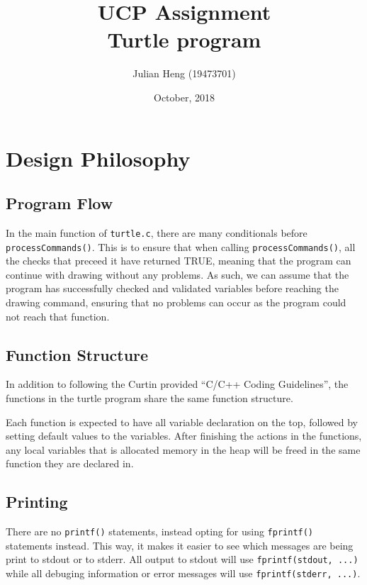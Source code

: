 \documentclass[a4paper, 12pt, titlepage]{article}
\title{\huge \textbf{UCP Assignment\\Turtle program}}
\author{Julian Heng (19473701)}
\date{October, 2018}
\newcommand{\code}[1]{\small\texttt{#1}\normalsize}
\begin{document}
\maketitle
\tableofcontents
\newpage

\pagestyle{fancy}

\fancyhf[FC]{\thepage}

\section{Design Philosophy}

\subsection{Program Flow}

In the main function of \code{turtle.c}, there are many conditionals 
before \code{processCommands()}. This is to ensure that when calling 
\code{processCommands()}, all the checks that preceed it have returned 
TRUE, meaning that the program can continue with drawing without any 
problems. As such, we can assume that the program has successfully checked 
and validated variables before reaching the drawing command, ensuring 
that no problems can occur as the program could not reach that function.

\subsection{Function Structure}

In addition to following the Curtin provided ``C/C++ Coding Guidelines'', 
the functions in the turtle program share the same function structure.

Each function is expected to have all variable declaration on the top, 
followed by setting default values to the variables. After finishing the 
actions in the functions, any local variables that is allocated memory 
in the heap will be freed in the same function they are declared in.

\subsection{Printing}

There are no \code{printf()} statements, instead opting for using 
\code{fprintf()} statements instead. This way, it makes it easier to 
see which messages are being print to stdout or to stderr. All output 
to stdout will use \code{fprintf(stdout, ...)} while all debuging 
information or error messages will use \code{fprintf(stderr, ...)}.
\end{document}
